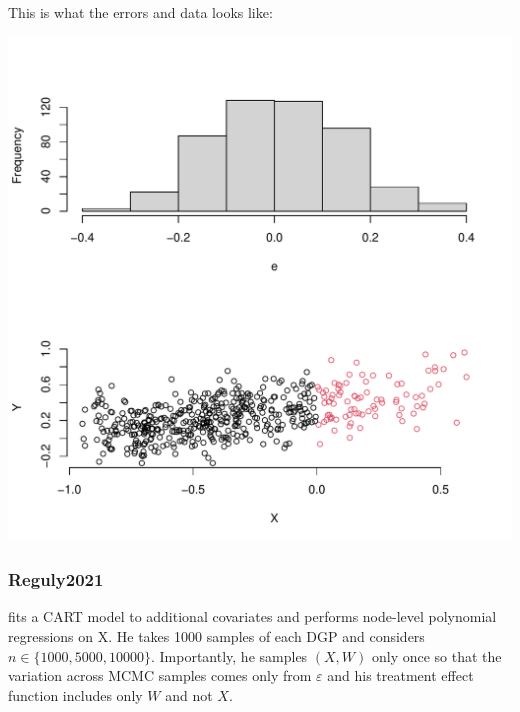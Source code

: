 \documentclass[11pt]{article}
\begin{document}
This is what the errors and data looks like:

\begin{center}
\includegraphics[width=.9\linewidth]{KR2023.pdf}
\end{center}

\subsubsection{Reguly2021}
\label{sec:org9afb512}
\cite{reguly2021heterogeneous} fits a CART model to additional
covariates and performs node-level polynomial regressions on
X. He takes 1000 samples of each DGP and considers \(n \in
\{1000,5000,10000\}\). Importantly, he samples \((X,W)\) only
once so that the variation across MCMC samples comes only
from \(\varepsilon\) and his treatment effect function
includes only \(W\) and not \(X\).
\end{document}
